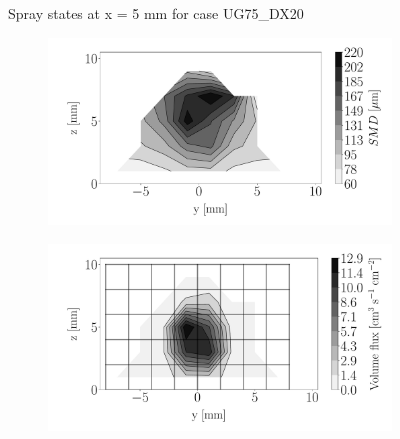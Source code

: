 \begin{figure}[h!]
\begin{subfigure}[b]{0.3\textwidth}
\end{subfigure}
\caption{Spray states at x = 5 mm for case UG75\_DX20}
\label{fig:injectors_sli_uG75_dx20_x05}
\end{figure}




\begin{figure}[h!]
\centering
\begin{subfigure}[b]{0.3\textwidth}
	\centering
   \includegraphics[scale=0.15]{./part2_developments/figures_ch5_resolved_JICF/injectors_SLI/uG75_dx20_x10_SMD_map}
\end{subfigure}
   \hspace{0.17in}
\begin{subfigure}[b]{0.3\textwidth}
	\centering
   \includegraphics[scale=0.15]{./part2_developments/figures_ch5_resolved_JICF/injectors_SLI/uG75_dx20_x10_volume_flux_map}
\end{subfigure}
   \hspace{0.17in}

\end{figure}
